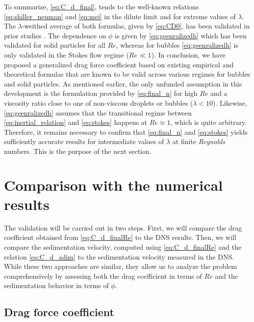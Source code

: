 To summarize, \ref{eq:C_d_final}, tends to the well-known relations \ref{eq:shiller_neuman} and \ref{eq:mei} in the dilute limit and for extreme values of $\lambda$.
The $\lambda$-weithed average of both formulas, given by \ref{eq:CD0}, has been validated in prior studies \citep{rivkind1976flow}. 
The dependence on $\phi$ is given by \ref{eq:geenralizedh} which has been validated for solid particles for all $Re$, whereas for bubbles \ref{eq:geenralizedh} is only validated in the Stokes flow regime ($Re \ll 1$). 
In conclusion, we have proposed a generalized drag force coefficient based on existing empirical and theoretical formulas that are known to be valid across various regimes for bubbles and solid particles. 
As mentioned earlier, the only unfunded assumption in this development is the formulation provided by \ref{eq:final_n} for high $Re$ and a viscosity ratio close to one of non-viscous droplets or bubbles ($\lambda < 10$). 
Likewise, \ref{eq:geenralizedh} assumes that the transitional regime between \ref{eq:inertial_relation} and \ref{eq:stokes} happens at $Re \approx 1$, which is quite arbitrary.  
Therefore, it remains necessary to confirm that \ref{eq:final_n} and \ref{eq:stokes} yields sufficiently accurate results for intermediate values of $\lambda$ at finite \textit{Reynolds} numbers. 
This is the purpose of the next section. 

\section{Comparison with the numerical results}
\label{sec:validation_drag}

The validation will be carried out in two steps. 
First, we will compare the drag coefficient obtained from \ref{eq:C_d_finalRe} to the DNS results. 
Then, we will compare the sedimentation velocity, computed using \ref{eq:C_d_finalRe} and the relation \ref{eq:C_d_adim} to the sedimentation velocity measured in the DNS.
While these two approaches are similar, they allow us to analyze the problem comprehensively by assessing both the drag coefficient in terms of $Re$ and the sedimentation behavior in terms of $\phi$.  

\subsection{Drag force coefficient}


